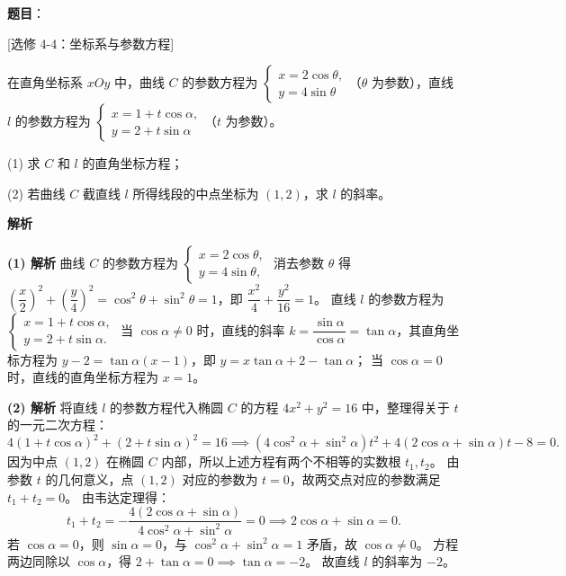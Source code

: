\begin{answer}

\textbf{题目}：

[选修 4-4：坐标系与参数方程]

在直角坐标系 $xOy$ 中，曲线 $C$ 的参数方程为 $\begin{cases}x=2\cos\theta,\\ y=4\sin\theta\end{cases}$（$\theta$ 为参数），直线 $l$ 的参数方程为 $\begin{cases}x=1+t\cos\alpha,\\ y=2+t\sin\alpha\end{cases}$（$t$ 为参数）。

(1) 求 $C$ 和 $l$ 的直角坐标方程；

(2) 若曲线 $C$ 截直线 $l$ 所得线段的中点坐标为 $(1,2)$，求 $l$ 的斜率。

\textbf{解析}

\textbf{(1) 解析} 曲线 $C$ 的参数方程为 $\begin{cases}x=2\cos\theta,\\ y=4\sin\theta,\end{cases}$
消去参数 $\theta$ 得 $\left(\dfrac x2\right)^2 + \left(\dfrac y4\right)^2 = \cos^2\theta+\sin^2\theta=1$，即 $\dfrac{x^2}{4}+\dfrac{y^2}{16}=1$。
直线 $l$ 的参数方程为 $\begin{cases}x=1+t\cos\alpha,\\ y=2+t\sin\alpha.\end{cases}$
当 $\cos\alpha\ne 0$ 时，直线的斜率 $k = \dfrac{\sin\alpha}{\cos\alpha} = \tan\alpha$，其直角坐标方程为 $y-2 = \tan\alpha(x-1)$，即 $y=x\tan\alpha+2-\tan\alpha$；
当 $\cos\alpha=0$ 时，直线的直角坐标方程为 $x=1$。

\textbf{(2) 解析} 将直线 $l$ 的参数方程代入椭圆 $C$ 的方程 $4x^2+y^2=16$ 中，整理得关于 $t$ 的一元二次方程：
\nopagebreak[4]
\[4(1+t\cos\alpha)^2 + (2+t\sin\alpha)^2 = 16 \implies (4\cos^2\alpha+\sin^2\alpha)t^2 + 4(2\cos\alpha+\sin\alpha)t - 8 = 0.\]
因为中点 $(1,2)$ 在椭圆 $C$ 内部，所以上述方程有两个不相等的实数根 $t_1, t_2$。
由参数 $t$ 的几何意义，点 $(1,2)$ 对应的参数为 $t=0$，故两交点对应的参数满足 $t_1+t_2=0$。
由韦达定理得：
\nopagebreak[4]
\[t_1+t_2 = -\dfrac{4(2\cos\alpha+\sin\alpha)}{4\cos^2\alpha+\sin^2\alpha} = 0 \implies 2\cos\alpha+\sin\alpha = 0.\]
若 $\cos\alpha=0$，则 $\sin\alpha=0$，与 $\cos^2\alpha+\sin^2\alpha=1$ 矛盾，故 $\cos\alpha\ne 0$。
方程两边同除以 $\cos\alpha$，得 $2+\tan\alpha=0 \implies \tan\alpha=-2$。
故直线 $l$ 的斜率为 $-2$。



\end{answer}
